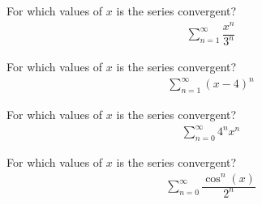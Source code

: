 \begin{exercise}
For which values of $x$ is the series convergent?
\begin{align*}
    \sum_{n=1}^{\infty}\dfrac{x^{n}}{3^{n}}
\end{align*}
\end{exercise}

\begin{exercise}
For which values of $x$ is the series convergent?
\begin{align*}
    \sum_{n=1}^{\infty}(x - 4)^{n}
\end{align*}
\end{exercise}

\begin{exercise}
For which values of $x$ is the series convergent?
\begin{align*}
    \sum_{n=0}^{\infty}4^{n}x^{n} 
\end{align*}
\end{exercise}

\begin{exercise}
For which values of $x$ is the series convergent?
\begin{align*}
    \sum_{n=0}^{\infty}\dfrac{\cos^{n}(x)}{2^{n}}
\end{align*}
\end{exercise}